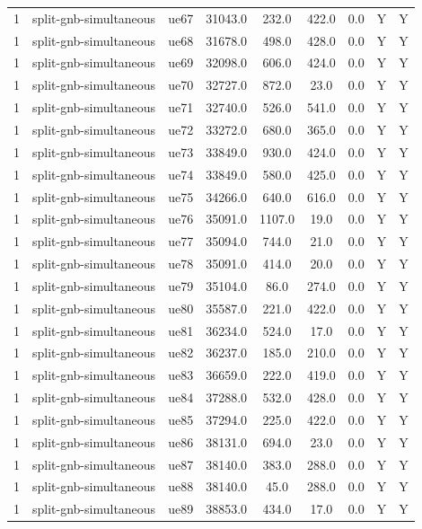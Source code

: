 \begin{table}[ht]
\begin{tabular}{|c|c|c|c|c|c|c|c|c|}
1 & split-gnb-simultaneous & ue67 & 31043.0 & 232.0 & 422.0 & 0.0 & Y & Y \\
1 & split-gnb-simultaneous & ue68 & 31678.0 & 498.0 & 428.0 & 0.0 & Y & Y \\
1 & split-gnb-simultaneous & ue69 & 32098.0 & 606.0 & 424.0 & 0.0 & Y & Y \\
1 & split-gnb-simultaneous & ue70 & 32727.0 & 872.0 & 23.0 & 0.0 & Y & Y \\
1 & split-gnb-simultaneous & ue71 & 32740.0 & 526.0 & 541.0 & 0.0 & Y & Y \\
1 & split-gnb-simultaneous & ue72 & 33272.0 & 680.0 & 365.0 & 0.0 & Y & Y \\
1 & split-gnb-simultaneous & ue73 & 33849.0 & 930.0 & 424.0 & 0.0 & Y & Y \\
1 & split-gnb-simultaneous & ue74 & 33849.0 & 580.0 & 425.0 & 0.0 & Y & Y \\
1 & split-gnb-simultaneous & ue75 & 34266.0 & 640.0 & 616.0 & 0.0 & Y & Y \\
1 & split-gnb-simultaneous & ue76 & 35091.0 & 1107.0 & 19.0 & 0.0 & Y & Y \\
1 & split-gnb-simultaneous & ue77 & 35094.0 & 744.0 & 21.0 & 0.0 & Y & Y \\
1 & split-gnb-simultaneous & ue78 & 35091.0 & 414.0 & 20.0 & 0.0 & Y & Y \\
1 & split-gnb-simultaneous & ue79 & 35104.0 & 86.0 & 274.0 & 0.0 & Y & Y \\
1 & split-gnb-simultaneous & ue80 & 35587.0 & 221.0 & 422.0 & 0.0 & Y & Y \\
1 & split-gnb-simultaneous & ue81 & 36234.0 & 524.0 & 17.0 & 0.0 & Y & Y \\
1 & split-gnb-simultaneous & ue82 & 36237.0 & 185.0 & 210.0 & 0.0 & Y & Y \\
1 & split-gnb-simultaneous & ue83 & 36659.0 & 222.0 & 419.0 & 0.0 & Y & Y \\
1 & split-gnb-simultaneous & ue84 & 37288.0 & 532.0 & 428.0 & 0.0 & Y & Y \\
1 & split-gnb-simultaneous & ue85 & 37294.0 & 225.0 & 422.0 & 0.0 & Y & Y \\
1 & split-gnb-simultaneous & ue86 & 38131.0 & 694.0 & 23.0 & 0.0 & Y & Y \\
1 & split-gnb-simultaneous & ue87 & 38140.0 & 383.0 & 288.0 & 0.0 & Y & Y \\
1 & split-gnb-simultaneous & ue88 & 38140.0 & 45.0 & 288.0 & 0.0 & Y & Y \\
1 & split-gnb-simultaneous & ue89 & 38853.0 & 434.0 & 17.0 & 0.0 & Y & Y \\

\end{tabular}
\end{table}
